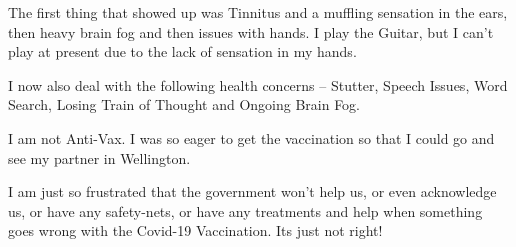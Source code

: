 The first thing that showed up was Tinnitus and a muffling sensation in the
ears, then heavy brain fog and then issues with hands. I play the Guitar, but I
can’t play at present due to the lack of sensation in my hands.

I now also deal with the following health concerns – Stutter, Speech Issues,
Word Search, Losing Train of Thought and Ongoing Brain Fog.

I am not Anti-Vax. I was so eager to get the vaccination so that I could go and
see my partner in Wellington.

I am just so frustrated that the government won’t help us, or even acknowledge
us, or have any safety-nets, or have any treatments and help when something goes
wrong with the Covid-19 Vaccination. Its just not right!
